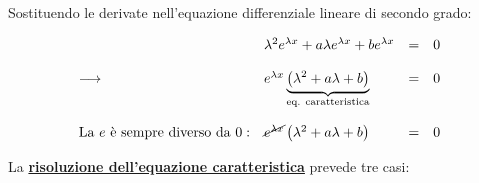\documentclass[a4paper]{article}
\begin{document}
	\noindent
	Sostituendo le derivate nell'equazione differenziale lineare di secondo grado:
	
	\begin{equation*}
		\begin{array}{llll}
			& \lambda^{2}e^{\lambda x} + a\lambda e^{\lambda x} + b e^{\lambda x}	& = & 0 \\
			&&& \\
			\longrightarrow & e^{\lambda x}	\underbrace{\left(\lambda^{2} + a\lambda + b\right)}_{\text{eq. caratteristica}}	& = & 0 \\
			&&& \\
			\text{La } e \text{ è sempre diverso da } 0: & \cancel{e^{\lambda x}} \left(\lambda^{2} + a\lambda + b\right) & = & 0
		\end{array}
	\end{equation*}

	\noindent
	La \textbf{\underline{risoluzione dell'equazione caratteristica}} prevede tre casi:
	
\end{document}
